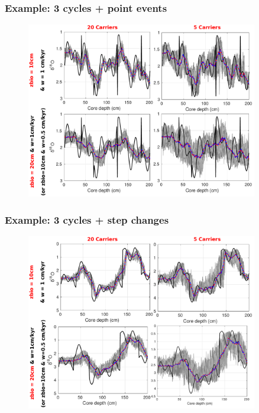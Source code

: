 \documentclass{beamer}
\begin{document}
\begin{frame}
\frametitle{Example: 3 cycles + point events}
\begin{figure}[hbtp]
\hspace*{-0.8cm}\includegraphics[width=0.9\textwidth]{figures/JustABU_3ycles_combined_pointevents.pdf}%
\end{figure}
\end{frame}

\begin{frame}
\frametitle{Example: 3 cycles + step changes}
\begin{figure}[hbtp]
\hspace*{-0.8cm}\includegraphics[width=0.9\textwidth]{figures/JustABU_3ycles_combined_gradual.pdf}%
\end{figure}
\end{frame}
\end{document}
